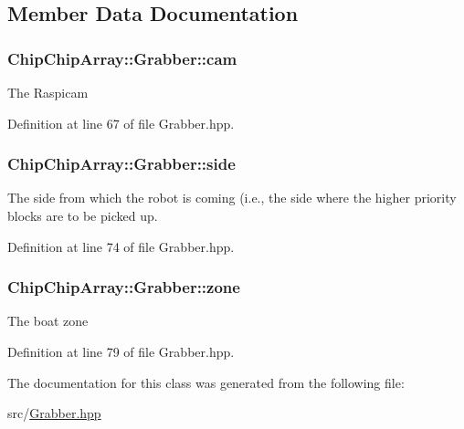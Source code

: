 \subsection{Member Data Documentation}
\hypertarget{classChipChipArray_1_1Grabber_a726bcc2367a719cb84de92a981947622}{
\subsubsection[{cam}]{ Chip\+Chip\+Array\+::\+Grabber\+::cam\hspace{0.3cm}{\ttfamily [protected]}}}\label{classChipChipArray_1_1Grabber_a726bcc2367a719cb84de92a981947622}
The Raspicam 

Definition at line 67 of file Grabber.\+hpp.

\hypertarget{classChipChipArray_1_1Grabber_a8afbaefae7c767c862fd1bf13968539b}{
\subsubsection[{side}]{ Chip\+Chip\+Array\+::\+Grabber\+::side\hspace{0.3cm}{\ttfamily [protected]}}}\label{classChipChipArray_1_1Grabber_a8afbaefae7c767c862fd1bf13968539b}
The side from which the robot is coming (i.\+e., the side where the higher priority blocks are to be picked up. 

Definition at line 74 of file Grabber.\+hpp.

\hypertarget{classChipChipArray_1_1Grabber_ab57efe6e0b6f369b19528285a278d967}{
\subsubsection[{zone}]{ Chip\+Chip\+Array\+::\+Grabber\+::zone\hspace{0.3cm}{\ttfamily [protected]}}}\label{classChipChipArray_1_1Grabber_ab57efe6e0b6f369b19528285a278d967}
The boat zone 

Definition at line 79 of file Grabber.\+hpp.



The documentation for this class was generated from the following file\+:\begin{DoxyCompactItemize}
\item 
src/\hyperlink{Grabber_8hpp}{Grabber.\+hpp}\end{DoxyCompactItemize}
